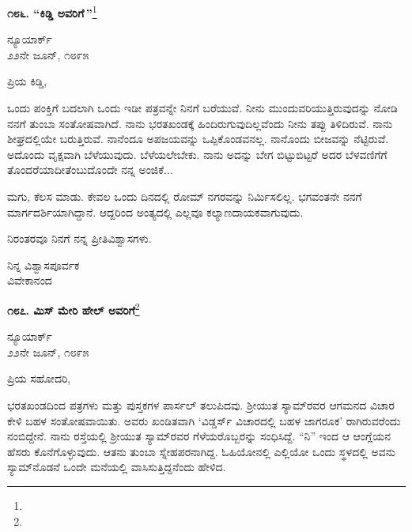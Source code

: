 \begin{center}
\textbf{೧೮೬. “ಕಿಡ್ಡಿ ಅವರಿಗೆ\,”}\footnote{}
\end{center}

\vspace{-0.7cm}

\begin{flushright}
ನ್ಯೂಯಾರ್ಕ್\\೨೨ನೇ ಜೂನ್, ೧೮೯೫
\end{flushright}

\vspace{-0.3cm}

\noindent
ಪ್ರಿಯ ಕಿಡ್ಡಿ,

ಒಂದು ಪಂಕ್ತಿಗೆ ಬದಲಾಗಿ ಒಂದು ಇಡೀ ಪತ್ರವನ್ನೇ ನಿನಗೆ ಬರೆಯುವೆ. ನೀನು ಮುಂದುವರಿಯುತ್ತಿರುವುದನ್ನು ನೋಡಿ ನನಗೆ ತುಂಬಾ ಸಂತೋಷವಾಗಿದೆ. ನಾನು ಭರತಖಂಡಕ್ಕೆ ಹಿಂದಿರುಗುವುದಿಲ್ಲವೆಂದು ನೀನು ತಪ್ಪು ತಿಳಿದಿರುವೆ. ನಾನು ಶೀಘ್ರದಲ್ಲಿಯೇ ಬರುತ್ತಿರುವೆ. ನಾನೆಂದೂ ಅಪಜಯವನ್ನು ಒಪ್ಪಿಕೊಂಡವನಲ್ಲ. ನಾನೊಂದು ಬೀಜವನ್ನು ನೆಟ್ಟಿರುವೆ. ಅದೊಂದು ವೃಕ್ಷವಾಗಿ ಬೆಳೆಯುವುದು. ಬೆಳೆಯಲೇಬೇಕು. ನಾನು ಅದನ್ನು ಬೇಗ ಬಿಟ್ಟುಬಿಟ್ಟರೆ ಅದರ ಬೆಳವಣಿಗೆಗೆ ತೊಂದರೆಯಾದೀತೆಂಬುದೊಂದೇ ನನ್ನ ಅಂಜಿಕೆ...

ಮಗು, ಕೆಲಸ ಮಾಡು. ಕೇವಲ ಒಂದು ದಿನದಲ್ಲಿ ರೋಮ್ ನಗರವನ್ನು ನಿರ್ಮಿಸಲಿಲ್ಲ. ಭಗವಂತನೇ ನನಗೆ ಮಾರ್ಗದರ್ಶಿಯಾಗಿದ್ದಾನೆ. ಆದ್ದರಿಂದ ಅಂತ್ಯದಲ್ಲಿ ಎಲ್ಲವೂ ಕಲ್ಯಾಣದಾಯಕವಾಗುವುದು.

ನಿರಂತರವೂ ನಿನಗೆ ನನ್ನ ಪ್ರೀತಿವಿಶ್ವಾಸಗಳು.

\vspace{-0.5cm}

{\flushright
ನಿನ್ನ ವಿಶ್ವಾಸಪೂರ್ವಕ\\ವಿವೇಕಾನಂದ\par}

\begin{center}
\textbf{೧೮೭. ಮಿಸ್ ಮೇರಿ ಹೇಲ್‌ ಅವರಿಗೆ}\footnote{}
\end{center}

\vspace{-0.6cm}

\begin{flushright}
ನ್ಯೂಯಾರ್ಕ್\\೨೨ನೇ ಜೂನ್, ೧೮೯೫
\end{flushright}

\vspace{-0.3cm}

\noindent
ಪ್ರಿಯ ಸಹೋದರಿ,

ಭರತಖಂಡದಿಂದ ಪತ್ರಗಳು ಮತ್ತು ಪುಸ್ತಕಗಳ ಪಾರ್ಸಲ್ ತಲುಪಿದವು. ಶ‍್ರೀಯುತ ಸ್ಯಾಮ್‌ರವರ ಆಗಮನದ ವಿಚಾರ ಕೇಳಿ ಬಹಳ ಸಂತೋಷವಾಯಿತು. ಅವರು ಖಂಡಿತವಾಗಿ ‘ವಿಡ್ಡರ್ಸ್ ವಿಚಾರದಲ್ಲಿ ಬಹಳ ಜಾಗರೂಕ’ ರಾಗಿರುವರೆಂದು ನಂಬಿದ್ದೇನೆ. ನಾನು ರಸ್ತೆಯಲ್ಲಿ ಶ‍್ರೀಯುತ ಸ್ಯಾಮ್‌ರವರ ಗೆಳೆಯರೊಬ್ಬರನ್ನು ಸಂಧಿಸಿದ್ದೆ. “ನಿ” ಇಂದ ಆ ಆಂಗ್ಲೆಯನ ಹೆಸರು ಕೊನೆಗೊಳ್ಳುವುದು. ಆತನು ತುಂಬಾ ಸ್ನೇಹಪರನಾಗಿದ್ದ. ಓಹಿಯೋನಲ್ಲಿ ಎಲ್ಲಿಯೋ ಒಂದು ಸ್ಥಳದಲ್ಲಿ ಅವನು ಸ್ಯಾಮ್‌ನೊಡನೆ ಒಂದೇ ಮನೆಯಲ್ಲಿ ವಾಸಿಸುತ್ತಿದ್ದನೆಂದು ಹೇಳಿದ.

